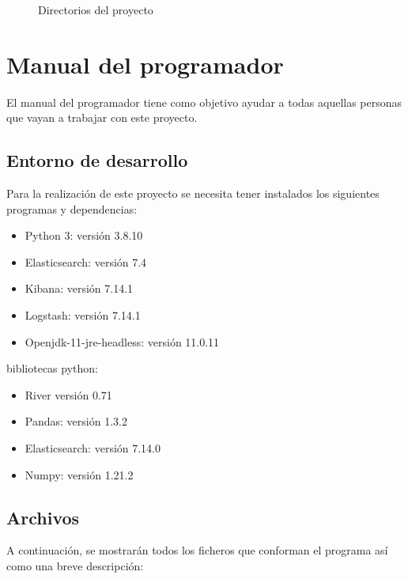 \begin{figure}[h]
	\caption{Directorios del proyecto}
	\label{directoriosdelproyecto}
\end{figure}

\newpage
\section{Manual del programador}

El manual del programador tiene como objetivo ayudar a todas aquellas personas que vayan a trabajar con este proyecto.
\subsection{Entorno de desarrollo}

Para la realización de este proyecto se necesita tener instalados los siguientes programas y dependencias:

\begin{itemize}
    \item Python 3: versión 3.8.10 
    \item Elasticsearch: versión 7.4
    \item Kibana: versión 7.14.1
    \item Logstash: versión 7.14.1
    \item Openjdk-11-jre-headless: versión 11.0.11
\end{itemize}
bibliotecas python:
\begin{itemize}
    \item River versión 0.71
    \item Pandas: versión 1.3.2
    \item Elasticsearch: versión 7.14.0
    \item Numpy: versión 1.21.2
\end{itemize}

\subsection{Archivos}
A continuación, se mostrarán todos los ficheros que conforman el programa así como una breve descripción:

